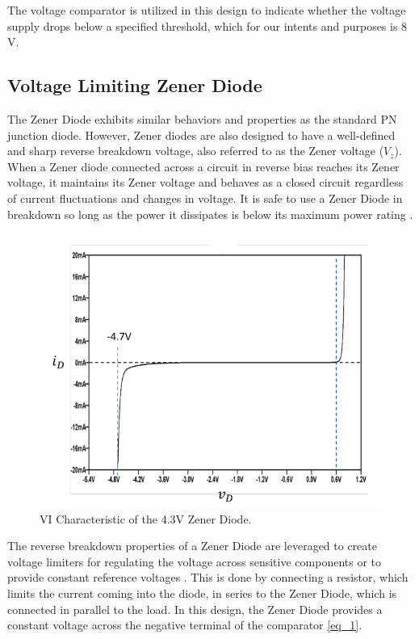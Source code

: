 \documentclass[conference]{IEEEtran}
\begin{document}
The voltage comparator is utilized in this design to indicate whether the voltage supply drops below a specified threshold, which for our intents and purposes is 8 V.

\subsection{Voltage Limiting Zener Diode}
The Zener Diode exhibits similar behaviors and properties as the standard PN junction diode. However, Zener diodes are also designed to have a well-defined and sharp reverse breakdown voltage, also referred to as the Zener voltage ($V_z$). When a Zener diode connected across a circuit in reverse bias reaches its Zener voltage, it maintains its Zener voltage and behaves as a closed circuit regardless of current fluctuations and changes in voltage. It is safe to use a Zener Diode in breakdown so long as the power it dissipates is below its maximum power rating \cite{week7}.

\begin{figure}[htbp]
\centerline{\includegraphics{./images/vi-characteristics.png}}
\caption{VI Characteristic of the 4.3V Zener Diode. \cite{week7}}
\label{fig}
\end{figure}

The reverse breakdown properties of a Zener Diode are leveraged to create voltage limiters for regulating the voltage across sensitive components or to provide constant reference voltages \cite{week7}. This is done by connecting a resistor, which limits the current coming into the diode, in series to the Zener Diode, which is connected in parallel to the load. In this design, the Zener Diode provides a constant voltage across the negative terminal of the comparator \eqref{eq_1}.
\end{document}
